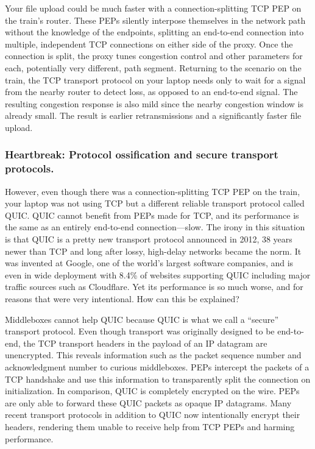 Your file upload could be much faster with a connection-splitting TCP PEP on the
train's router. These PEPs silently interpose themselves in the network path
without the knowledge of the endpoints, splitting
an end-to-end connection into multiple, independent TCP connections on either
side of the proxy. Once the connection is split, the proxy tunes congestion
control and other parameters for each, potentially very different, path
segment. Returning to the scenario on the train, the TCP transport protocol on
your laptop needs only to wait for a signal from the nearby router to detect
loss, as opposed to an end-to-end signal. The resulting congestion response is
also mild since the nearby congestion window is already small. The result is
earlier retransmissions and a significantly faster file upload.

\subsubsection{Heartbreak: Protocol ossification and secure transport protocols.}

However, even though there was a connection-splitting TCP PEP on the train, your
laptop was not using TCP but a different reliable transport protocol called
QUIC. QUIC cannot benefit from PEPs made for TCP, and its performance is the
same as an entirely end-to-end connection---slow. The irony in this situation
is that QUIC is a pretty new transport protocol announced in 2012, 38 years
newer than TCP and long after lossy, high-delay networks became the norm. It
was invented at Google, one of the world's largest software companies, and is
even in wide deployment with 8.4\% of websites supporting QUIC including major
traffic sources such as Cloudflare. Yet its performance is so much worse, and
for reasons that were very intentional. How can this be explained?

Middleboxes cannot help QUIC because QUIC is what we call a ``secure'' transport
protocol. Even though transport was originally designed to be end-to-end, the
TCP transport headers in the payload of an IP datagram are unencrypted. This
reveals information such as the packet sequence number and acknowledgment
number to curious middleboxes. PEPs intercept the packets of a TCP handshake
and use this information to transparently split the connection on
initialization. In comparison, QUIC is completely encrypted on the wire. PEPs
are only able to forward these QUIC packets as opaque IP datagrams. Many recent
transport protocols in addition to QUIC now intentionally encrypt their
headers, rendering them unable to receive help from TCP PEPs and harming
performance.

